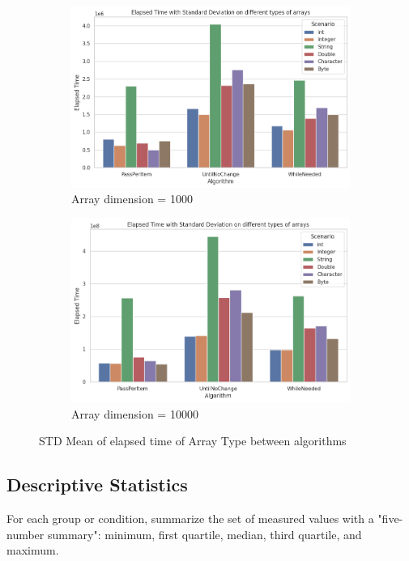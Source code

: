 \documentclass{article}
\begin{document}
\begin{figure}[H]
    \centering
    \begin{subfigure}[b]{0.48\textwidth}
        \centering
        \includegraphics[width=\textwidth]{./data/std_type_array_1000.png}
        \caption{Array dimension = 1000}
    \end{subfigure}
    \hfill
    \begin{subfigure}[b]{0.48\textwidth}
        \centering
        \includegraphics[width=\textwidth]{./data/std_type_array_10000.png}
        \caption{Array dimension = 10000}
    \end{subfigure}
    \caption{STD Mean of elapsed time of Array Type between algorithms}
\end{figure}


\subsection{Descriptive Statistics}
For each group or condition, summarize the set of measured values with a "five-number summary": minimum, first quartile, median, third quartile, and maximum. 
\end{document}
